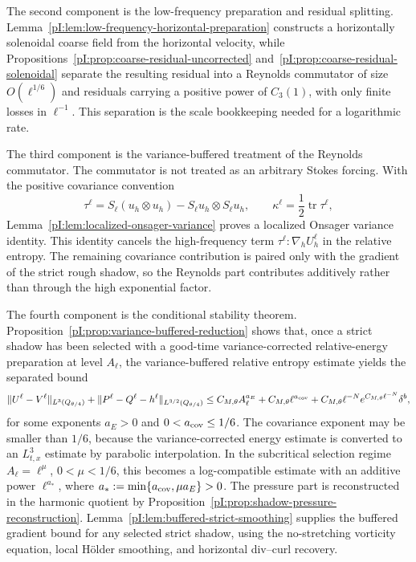 \documentclass[11pt]{article}
\numberwithin{equation}{section}
\theoremstyle{plain}
\theoremstyle{definition}
\theoremstyle{remark}
\begin{document}
The second component is the low-frequency preparation and residual splitting.  Lemma~\ref{pI:lem:low-frequency-horizontal-preparation} constructs a horizontally solenoidal coarse field from the horizontal velocity, while Propositions~\ref{pI:prop:coarse-residual-uncorrected} and~\ref{pI:prop:coarse-residual-solenoidal} separate the resulting residual into a Reynolds commutator of size \(O(\ell^{1/6})\) and residuals carrying a positive power of \(C_3(1)\), with only finite losses in \(\ell^{-1}\).  This separation is the scale bookkeeping needed for a logarithmic rate.

The third component is the variance-buffered treatment of the Reynolds commutator.  The commutator is not treated as an arbitrary Stokes forcing.  With the positive covariance convention
\[
        \tau^\ell=S_\ell(u_h\otimes u_h)-S_\ell u_h\otimes S_\ell u_h,
        \qquad
        \kappa^\ell=\frac12\operatorname{tr}\tau^\ell,
\]
Lemma~\ref{pI:lem:localized-onsager-variance} proves a localized Onsager variance identity.  This identity cancels the high-frequency term \(\tau^\ell:\nabla_h U_h^\ell\) in the relative entropy.  The remaining covariance contribution is paired only with the gradient of the strict rough shadow, so the Reynolds part contributes additively rather than through the high exponential factor.

The fourth component is the conditional stability theorem.  Proposition~\ref{pI:prop:variance-buffered-reduction} shows that, once a strict shadow has been selected with a good-time variance-corrected relative-energy preparation at level \(A_\ell\), the variance-buffered relative entropy estimate yields the separated bound
\[
        \|U^\ell-V^\ell\|_{L^3(Q_{\theta/4})}
        +\|P^\ell-Q^\ell-h^\ell\|_{L^{3/2}(Q_{\theta/4})}
        \le
        C_{M,\theta}A_\ell^{a_E}
        +C_{M,\theta}\ell^{a_{\rm cov}}
        +C_{M,\theta}\ell^{-N}e^{C_{M,\theta}\ell^{-N}}\delta^b,
\]
for some exponents \(a_E>0\) and \(0<a_{\rm cov}\le 1/6\).  The covariance exponent may be smaller than \(1/6\), because the variance-corrected energy estimate is converted to an \(L^3_{t,x}\) estimate by parabolic interpolation.  In the subcritical selection regime \(A_\ell=\ell^\mu\), \(0<\mu<1/6\), this becomes a log-compatible estimate with an additive power \(\ell^{a_*}\), where \(a_*:=\min\{a_{\rm cov},\mu a_E\}>0\).  The pressure part is reconstructed in the harmonic quotient by Proposition~\ref{pI:prop:shadow-pressure-reconstruction}.  Lemma~\ref{pI:lem:buffered-strict-smoothing} supplies the buffered gradient bound for any selected strict shadow, using the no-stretching vorticity equation, local H\"older smoothing, and horizontal div--curl recovery.
\end{document}
